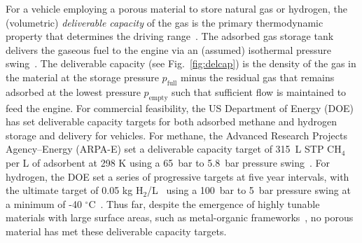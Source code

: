 \documentclass[twoside,twocolumn,9pt]{article}
\newcommand\pfull{\ensuremath{p_{\text{full}}}}
\newcommand\pempty{\ensuremath{p_{\text{empty}}}}
\begin{document}
For a vehicle employing a porous material to store natural gas or hydrogen, the
(volumetric) \emph{deliverable capacity} of the gas is the primary
thermodynamic property that determines the driving
range~\cite{mason2014evaluating}. The adsorbed gas storage tank delivers the
gaseous fuel to the engine via an (assumed) isothermal pressure
swing~\cite{sircar2002pressure}. The deliverable capacity (see
Fig.~\ref{fig:delcap}) is the density of the gas in the material at the storage
pressure $\pfull$ minus the residual gas that remains adsorbed at the lowest
pressure $\pempty$ such that sufficient flow is maintained to feed the engine.
For commercial feasibility, the US Department of Energy (DOE) has set
deliverable capacity targets for both adsorbed methane and hydrogen storage and
delivery for vehicles. For methane, the Advanced Research Projects
Agency--Energy (ARPA-E) set a deliverable capacity target of 315\ L STP CH$_4$
per L of adsorbent at 298 K using a 65\ bar to 5.8\ bar pressure
swing~\cite{simon2015materials}. For hydrogen, the DOE set a series of
progressive targets at five year intervals, with the ultimate target of 0.05 kg
H$_2$/L~\cite{h2targetsDOE} using a 100\ bar to 5\ bar pressure swing at a
minimum of -40 $^\circ$C~\cite{allendorf2018assessment}. Thus far, despite the
emergence of highly tunable materials with large surface areas, such as
metal-organic frameworks~\cite{furukawa2013chemistry}, no porous material has
met these deliverable capacity targets.

\end{document}
